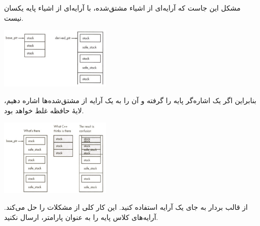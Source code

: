 مشکل این جاست که آرایه‌ای از اشیاء مشتق‌شده، با آرایه‌ای از اشیاء پایه یکسان نیست.
\begin{center}
    \includegraphics[keepaspectratio,width=0.4\textwidth,height=0.4\textheight]{images/image06.jpg}
\end{center}
بنابراین اگر یک اشاره‌گر پایه را گرفته و آن را به یک آرایه از مشتق‌شده‌ها اشاره دهیم، لایهٔ حافظه غلط خواهد بود.
\begin{center}
    \includegraphics[keepaspectratio,width=0.4\textwidth,height=0.4\textheight]{images/image07.jpg}
\end{center}
از قالب بردار  به جای یک آرایه استفاده کنید. این کار کلی از مشکلات را حل می‌کند. آرایه‌های کلاس پایه را به عنوان پارامتر، ارسال نکنید.